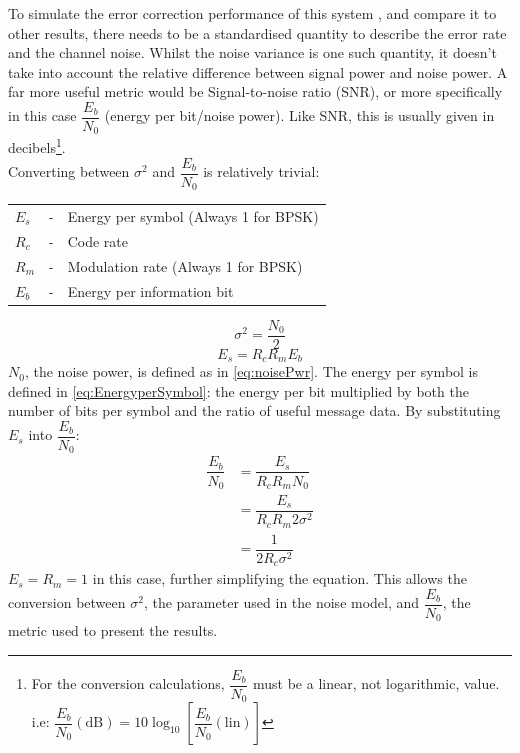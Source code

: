 \documentclass[11pt]{article}
\numberwithin{equation}{subsection}
\begin{document}
To simulate the error correction performance of this system \cite{gilley2003bit}, and compare it to other results, there needs to be a standardised quantity to describe the error rate and the channel noise. Whilst the noise variance is one such quantity, it doesn't take into account the relative difference between signal power and noise power. A far more useful metric would be Signal-to-noise ratio (SNR), or more specifically in this case $\dfrac{E_b}{N_0}$ (energy per bit/noise power). Like SNR, this is usually given in decibels\footnote{For the conversion calculations, $\dfrac{E_b}{N_0}$ must be a linear, not logarithmic, value. i.e: $\dfrac{E_b}{N_0}(\text{dB}) = 10\log_{10}\left[\dfrac{E_b}{N_0}(\text{lin})\right]$}. 
\vspace{3mm} \\
\noindent
Converting between $\sigma^2$ and $\dfrac{E_b}{N_0}$ is relatively trivial:
\vspace{3mm} \\
\noindent
\begin{tabular}{lcl}
$E_s$ & - & Energy per symbol (Always 1 for BPSK) \\
$R_c$ & - & Code rate \\
$R_m$ & - & Modulation rate (Always 1 for BPSK) \\
$E_b$ & - & Energy per information bit \\
\end{tabular}
\begin{equation} \label{eq:noisePwr}
\sigma^2 = \dfrac{N_0}{2}
\end{equation}
\begin{equation}\label{eq:EnergyperSymbol}
E_s = R_cR_mE_b
\end{equation}
$N_0$, the noise power, is defined as in \ref{eq:noisePwr}. The energy per symbol is defined in \ref{eq:EnergyperSymbol}: the energy per bit multiplied by both the number of bits per symbol and the ratio of useful message data. By substituting $E_s$ into $\dfrac{E_b}{N_0}$:
\begin{equation}
\begin{aligned}
\dfrac{E_b}{N_0} &= \dfrac{E_s}{R_cR_mN_0} \\
&= \dfrac{E_s}{R_cR_m2\sigma^2} \\
&= \dfrac{1}{2R_c\sigma^2}
\end{aligned}
\end{equation}
$E_s = R_m = 1$ in this case, further simplifying the equation. This allows the conversion between $\sigma^2$, the parameter used in the noise model, and $\dfrac{E_b}{N_0}$, the metric used to present the results.
\end{document}
